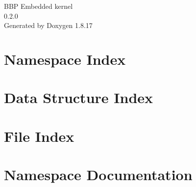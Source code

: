 \let\mypdfximage\pdfximage\def\pdfximage{\immediate\mypdfximage}\documentclass[twoside]{book}
\newcommand{\+}{\discretionary{\mbox{\scriptsize$\hookleftarrow$}}{}{}}
\newcommand{\clearemptydoublepage}{%
  \newpage{\pagestyle{empty}\cleardoublepage}%
}
\begin{document}
\hypersetup{pageanchor=false,
             bookmarksnumbered=true,
             pdfencoding=unicode
            }
\begin{titlepage}
\vspace*{7cm}
\begin{center}%
{\Large B\+BP Embedded kernel \\[1ex]\large 0.\+2.\+0 }\\
\vspace*{1cm}
{\large Generated by Doxygen 1.8.17}\\
\end{center}
\end{titlepage}
\clearemptydoublepage
{}
\tableofcontents
\clearemptydoublepage
{}
\hypersetup{pageanchor=true}

\chapter{Namespace Index}

\chapter{Data Structure Index}

\chapter{File Index}

\chapter{Namespace Documentation}






















\end{document}

